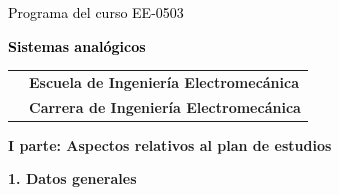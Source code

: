 \documentclass[letterpaper]{article}%
\begin{document}
%
\normalsize%
\thispagestyle{empty}%
%
\vspace*{100mm}%
\par\fontsize{14}{0}\selectfont \textcolor{black}{Programa del curso EE{-}0503}%
\par\fontsize{18}{25}\selectfont \textbf{\textcolor{black}{Sistemas analógicos}}%
\vspace*{15mm}%
\newline%
\begin{tabularx}{\textwidth}{m{}m{}}%
&\hspace*{0mm}\fontsize{12}{0}\selectfont \textbf{\textcolor{gris}{Escuela de Ingeniería Electromecánica}}\\%
[-12pt]%
&\hspace*{0mm}\fontsize{12}{0}\selectfont \textbf{\textcolor{gris}{Carrera de Ingeniería Electromecánica}}\\%
\end{tabularx}%
\newpage%
\pagestyle{headfoot}%
\par\fontsize{14}{0}\selectfont \textbf{\textcolor{parte}{I parte: Aspectos relativos al plan de estudios}}%
\par\hspace*{2mm}\fontsize{12}{14}\selectfont \textbf{\textcolor{parte}{1. Datos generales}}%
\vspace*{3mm}%
\newline%
\fontsize{10}{12}\selectfont %
\end{document}
